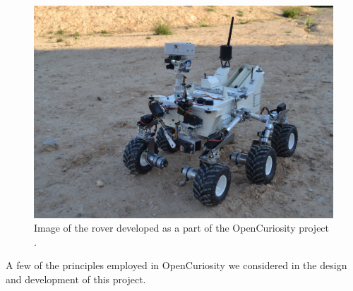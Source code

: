       \begin{figure}[h!]
        \centering
        \includegraphics[width=0.7\linewidth]{figures/openCuriosityRover}
        \caption[Image of the rover developed as a part of the OpenCuriosity project.]{Image of the rover developed as a part of the OpenCuriosity project \cite{fig:openCuriosityRover_cite}.}
        \label{fig:openCuriosityRover}
      \end{figure}
      
      
      A few of the principles employed in OpenCuriosity we considered in the design and development of this project.